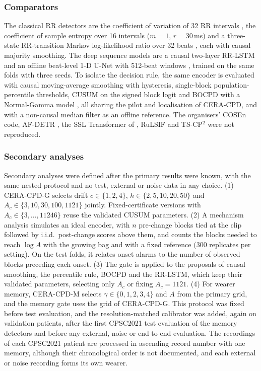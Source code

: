 \documentclass[preprint,12pt]{elsarticle}
\newcommand{\method}{CERA-CPD}
\newcommand{\1}{\mathbf{1}}
\begin{document}


\subsubsection{Comparators}
\label{sec:comparators}
The classical RR detectors are the coefficient of variation of 32 RR intervals \cite{tateno2001}, the coefficient of sample entropy over 16 intervals ($m=1$, $r=30$\,ms) \cite{lake2011cosen} and a three-state RR-transition Markov log-likelihood ratio over 32 beats \cite{moody1983afdb,kalidas2019markov}, each with causal majority smoothing. The deep sequence models are a causal two-layer RR-LSTM \cite{faust2018} and an offline beat-level 1-D U-Net with 512-beat windows \cite{ronneberger2015unet,wen2022paf}, trained on the same folds with three seeds. To isolate the decision rule, the same encoder is evaluated with causal moving-average smoothing with hysteresis, single-block population-percentile thresholds, CUSUM on the signed block logit \cite{page1954} and BOCPD with a Normal-Gamma model \cite{adams2007bocpd}, all sharing the pilot and localisation of \method{}, and with a non-causal median filter as an offline reference. The organisers' COSEn code, AF-DETR \cite{wang2025afdetr}, the SSL Transformer of \cite{yun2024safer}, RuLSIF and TS-CP$^2$ were not reproduced.

\subsubsection{Secondary analyses}
\label{sec:secondary}
Secondary analyses were defined after the primary results were known, with the same nested protocol and no test, external or noise data in any choice. (1) \method{}-G selects drift $c\in\{1,2,4\}$, $h\in\{2,5,10,20,50\}$ and $A_c\in\{3,10,30,100,1121\}$ jointly. Fixed-certificate versions with $A_c\in\{3,\dots,11246\}$ reuse the validated CUSUM parameters. (2) A mechanism analysis simulates an ideal encoder, with $n$ pre-change blocks tied at the clip followed by i.i.d.\ post-change scores above them, and counts the blocks needed to reach $\log A$ with the growing bag and with a fixed reference (300 replicates per setting). On the test folds, it relates onset alarms to the number of observed blocks preceding each onset. (3) The gate is applied to the proposals of causal smoothing, the percentile rule, BOCPD and the RR-LSTM, which keep their validated parameters, selecting only $A_c$ or fixing $A_c=1121$. (4) For wearer memory, \method{}-M selects $\gamma\in\{0,1,2,3,4\}$ and $A$ from the primary grid, and the memory gate uses the grid of \method{}-G. This protocol was fixed before test evaluation, and the resolution-matched calibrator was added, again on validation patients, after the first CPSC2021 test evaluation of the memory detectors and before any external, noise or end-to-end evaluation. The recordings of each CPSC2021 patient are processed in ascending record number with one memory, although their chronological order is not documented, and each external or noise recording forms its own wearer.
\end{document}
